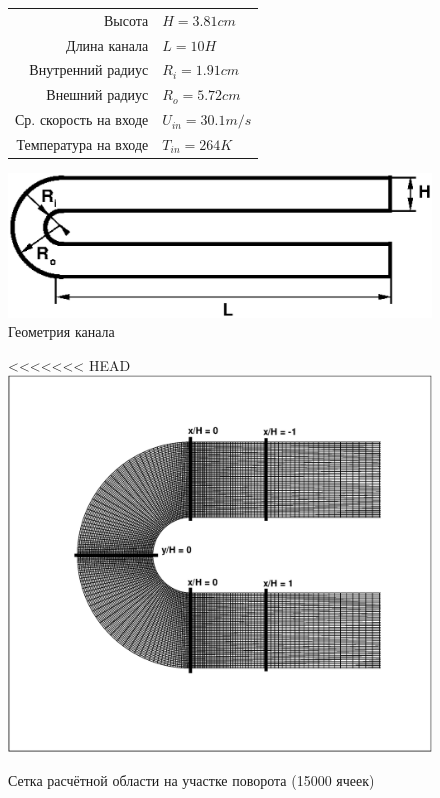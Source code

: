 \begin{figure}[h]
	\begin{minipage}{0.5\linewidth}
			\begin{tabular}{r l}
				\hline
				\label{tableUDuct}
				Высота & $H=3.81cm$ \\
				Длина канала & $L = 10H$ \\
				Внутренний радиус & $R_i = 1.91cm$ \\
				Внешний радиус & $R_o = 5.72cm$ \\
				Ср. скорость на входе & $U_{in} = 30.1 m/s$ \\
				Температура на входе & $T_{in} = 264 K$ \\
			\end{tabular}
	\end{minipage}
	\hspace{2em}
	\begin{minipage}{0.4\linewidth}
		\begin{flushright}
		\includegraphics[scale=0.4]{UDuct}
		\caption{Геометрия канала}
		\end{flushright}
	\end{minipage}
\end{figure}
\newpage
\begin{figure}[h]
	\centering
<<<<<<< HEAD
	\includegraphics[scale=0.6]{sampleLinesAndMesh}
	\caption{Сетка расчётной области на участке поворота (15000 ячеек)}
	\label{fig:sampleLinesAndMesh}
\end{figure}
